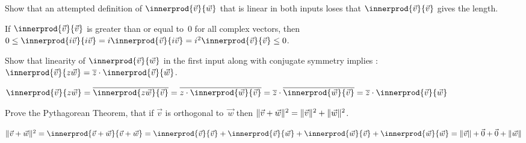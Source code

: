 \begin{exercises}
\item
Show that an attempted definition of $\innerprod{\vec{v}}{\vec{w}}$
that is linear in both inputs
loses that $\innerprod{\vec{v}}{\vec{v}}$ gives the length.
\begin{answer}
If
$\innerprod{\vec{v}}{\vec{v}}$ is greater than or equal to~$0$ for all
complex vectors,
then 
$0\leq \innerprod{i\vec{v}}{i\vec{v}}
  =i\innerprod{\vec{v}}{i\vec{v}}
  =i^2\innerprod{\vec{v}}{\vec{v}}\leq 0$.
\end{answer}

\item Show that linearity of $\innerprod{\vec{v}}{\vec{w}}$ in the first
input along with conjugate symmetry implies 
:
$\innerprod{\vec{v}}{z\vec{w}}=\compconj{z}\cdot \innerprod{\vec{v}}{\vec{w}}$.
\begin{answer}
$\innerprod{\vec{v}}{z\vec{w}}
=\compconj{\innerprod{z\vec{w}}{\vec{v}}}
=\compconj{z\cdot\innerprod{\vec{w}}{\vec{v}}}
=\compconj{z}\cdot\compconj{\innerprod{\vec{w}}{\vec{v}}}
=
\compconj{z}\cdot \innerprod{\vec{v}}{\vec{w}}$
\end{answer}

\item Prove the Pythagorean Theorem,  
that if $\vec{v}$ is orthogonal to~$\vec{w}$ then 
$\lVert\vec{v}+\vec{w}\rVert^2=\lVert\vec{v}\rVert^2+\lVert\vec{w}\rVert^2$.
\begin{answer}
$
\norm{\vec{v}+\vec{w}}^2
=\innerprod{\vec{v}+\vec{w}}{\vec{v}+\vec{w}}
=\innerprod{\vec{v}}{\vec{v}}
  +\innerprod{\vec{v}}{\vec{w}}
  +\innerprod{\vec{w}}{\vec{v}}
  +\innerprod{\vec{w}}{\vec{w}}
=\norm{\vec{v}}
  +\zero
  +\zero
  +\norm{\vec{w}}
$
\end{answer}



\end{exercises}
\endinput
% 